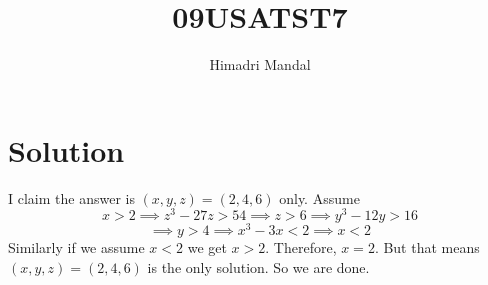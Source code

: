 \documentclass[11pt]{scrartcl}
\title{09USATST7}
\author{Himadri Mandal}
\begin{document}
\maketitle

\section{Solution}
\begin{soln}
	
I claim the answer is $(x,y,z)=(2,4,6)$ only.
Assume $$x > 2 \implies z^3 - 27z > 54 \implies z > 6 \implies y^3 - 12y > 16$$ $$\implies y > 4 \implies x^3 - 3x < 2 \implies x < 2$$ 
Similarly if we assume $x < 2$ we get $x > 2$. Therefore, $x = 2$. But that means $(x,y,z) = (2,4,6)$ is the only solution. 
So we are done.
\end{soln}
\end{document}
